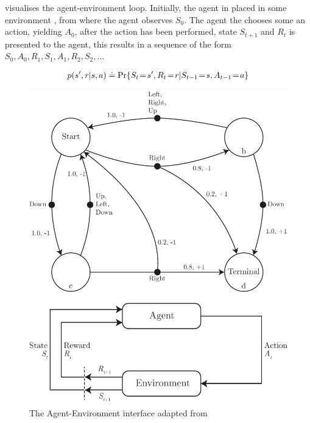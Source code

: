 \vspace*{0.5cm}

 visualises the agent-environment loop. 
Initially, the agent in placed in some environment , from where the agent observes $S_0$.
The agent the chooses some an action, yielding $A_0$, after the action has been performed, state $S_{t+1}$ and $R_t$ is presented to the agent, this results in a sequence of the form $S_0,A_0,R_1,S_1,A_1,R_2,S_2,\ldots$



\begin{align*}
    p(s',r | s,a) \defeq \Pr{S_t\!=\!s', R_t\!=\!r | S_{t-1}\!=\!s, A_{t-1}\!=\!a}
\end{align*}

\begin{figure}[!htb]
    \centering
    \includegraphics[scale=0.8]{../include/PDF/MDP.pdf}
    \caption{\todo}
    \label{fig:MDP}
\end{figure}

\begin{figure}[!htb]
    \centering
    \includegraphics[scale=1]{../include/agent-environment-loop.pdf}
    \caption{The Agent-Environment interface adapted from \citep{RLBook2018}}
    \label{fig:agent-environment}
\end{figure}



